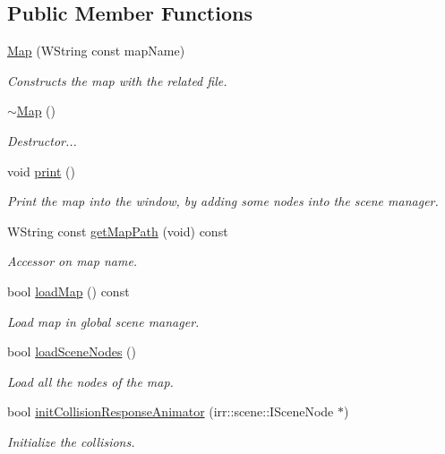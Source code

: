 \subsection*{Public Member Functions}
\begin{DoxyCompactItemize}
\item 
\hyperlink{classMap_a2e6d2bce865999917deae256baaa434d}{Map} (W\+String const map\+Name)
\begin{DoxyCompactList}\small\item\em Constructs the map with the related file. \end{DoxyCompactList}\item 
\mbox{\label{classMap_aa403fbe09394ccf39747588f5168e3b2}} 
\hyperlink{classMap_aa403fbe09394ccf39747588f5168e3b2}{$\sim$\+Map} ()
\begin{DoxyCompactList}\small\item\em Destructor... \end{DoxyCompactList}\item 
\mbox{\label{classMap_a9c6dc88a70dcf25e3371d8bc4ec35ad0}} 
void \hyperlink{classMap_a9c6dc88a70dcf25e3371d8bc4ec35ad0}{print} ()
\begin{DoxyCompactList}\small\item\em Print the map into the window, by adding some nodes into the scene manager. \end{DoxyCompactList}\item 
\mbox{\label{classMap_a47f72d481d0ed624dfd03e63ebd281e5}} 
W\+String const \hyperlink{classMap_a47f72d481d0ed624dfd03e63ebd281e5}{get\+Map\+Path} (void) const
\begin{DoxyCompactList}\small\item\em Accessor on map name. \end{DoxyCompactList}\item 
bool \hyperlink{classMap_ae085956bff7ba817bb82fc37bb8231df}{load\+Map} () const
\begin{DoxyCompactList}\small\item\em Load map in global scene manager. \end{DoxyCompactList}\item 
bool \hyperlink{classMap_a7b66b582699a4ea8108eebd86b1aca57}{load\+Scene\+Nodes} ()
\begin{DoxyCompactList}\small\item\em Load all the nodes of the map. \end{DoxyCompactList}\item 
\mbox{\label{classMap_ae9e45f8dfc053d75da2e8ba616f39269}} 
bool \hyperlink{classMap_ae9e45f8dfc053d75da2e8ba616f39269}{init\+Collision\+Response\+Animator} (irr\+::scene\+::\+I\+Scene\+Node $\ast$)
\begin{DoxyCompactList}\small\item\em Initialize the collisions. \end{DoxyCompactList}\end{DoxyCompactItemize}


